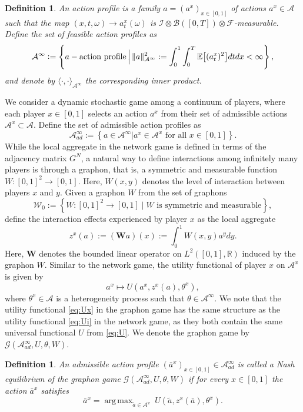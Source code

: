 \documentclass[11pt]{article}
\def\E{{\mathbb{E}}}
\newcommand{\R}{{\mathbb R}}
\DeclareMathOperator*{\argmax}{arg\,max}
\newcommand{\be}{\begin{equation}}
\newcommand{\ee}{\end{equation}}
\newtheorem{definition}[theorem]{Definition}
\numberwithin{equation}{section}
\begin{document}
\begin{definition}\label{def:action-profile}
An action profile is a family $a=(a^x)_{x\in [0,1]}$ of actions $a^x\in\mathcal{A}$ such that the map $(x,t,\omega)\to a_t^x(\omega)$ is $\mathcal{I}\otimes\mathcal{B}([0,T])\otimes\mathcal{F}$-measurable.
Define the set of feasible action profiles as
\be\label{eq:Ainfty}
\mathcal{A}^\infty\vcentcolon=\left\{a-\textrm{action profile}\,\Big| \,\|a\|^2_{\mathcal{A}^\infty}:=\int_0^1\int_0^T\E\big[(a_t^x)^2\big]dtdx<\infty\right\},
\ee
and denote by $\langle\cdot,\cdot\rangle_{\mathcal{A}^\infty}$ the corresponding inner product.  
\end{definition}
We consider a dynamic stochastic game among a continuum of players, where each player $x\in [0,1]$ selects an action $a^x$  from their set of admissible actions $\mathcal{A}^x\subset\mathcal{A}$. 
Define the set of admissible action profiles as
\be\label{eq:Aadinfty}
\mathcal{A}_{ad}^\infty:=\left\{a\in\mathcal{A}^\infty\Big| a^x\in\mathcal{A}^x\textrm{ for all }x\in [0,1]\right\}.
\ee
While the local aggregate in the network game is defined in terms of the adjacency matrix $G^N$, a natural way to define interactions among infinitely many players is through a graphon, that is, a symmetric and measurable function $W:[0,1]^2\to[0,1]$. Here, $W(x,y)$ denotes the level of interaction between players $x$ and $y$. Given a graphon $W$ from the set of graphons
$$
\mathcal{W}_0:=\left\{W:[0,1]^2\to[0,1]\mid W\textrm{ is symmetric and measurable}\right\},
$$
define the interaction effects experienced by player $x$ as the local aggregate
\be \label{eq:graphon-operator}
z^x(a):=(\boldsymbol{W}a)(x):=\int_0^1W(x,y)a^ydy.
\ee
Here, $\boldsymbol{W}$ denotes the bounded linear operator on $L^2([0,1],\R)$ induced by the graphon $W$. Similar to the network game, the utility functional of player $x$ on $\mathcal{A}^x$ is given by 
\be \label{eq:Ux}
a^x\mapsto U\left(a^x,z^x(a),\theta^x\right),
\ee
where $\theta^x\in\mathcal{A}$ is a heterogeneity process such that $\theta\in\mathcal{A}^\infty$. 
We note that the utility functional \eqref{eq:Ux} in the graphon game has the same structure as the utility functional \eqref{eq:Ui} in the network game, as they both contain the same universal functional $U$ from \eqref{eq:U}. We denote the graphon game by $\mathcal{G}(\mathcal{A}_{ad}^\infty,U,\theta,W)$.
\begin{definition} \label{def:Nash-infinite-player}
An admissible action profile $(\bar{a}^{x})_{x\in [0,1]}\in\mathcal{A}_{ad}^\infty$ is called a Nash equilibrium of the graphon game $\mathcal{G}(\mathcal{A}_{ad}^\infty,U,\theta,W)$ if for every $x\in [0,1]$ the action $\bar a^x$ satisfies 
\be \label{graph-game}
\bar a^x=\argmax_{\tilde {a}\in\mathcal{A}^x} \ U\left(\tilde{a}, z^x(\bar a),\theta^x\right).
\ee
\end{definition}
 
\end{document}
